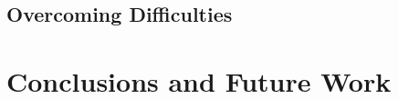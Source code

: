 \documentclass[fleqn,11pt]{article}
\begin{document}


\subsection{Overcoming Difficulties}



\section{Conclusions and Future Work}
\end{document}
